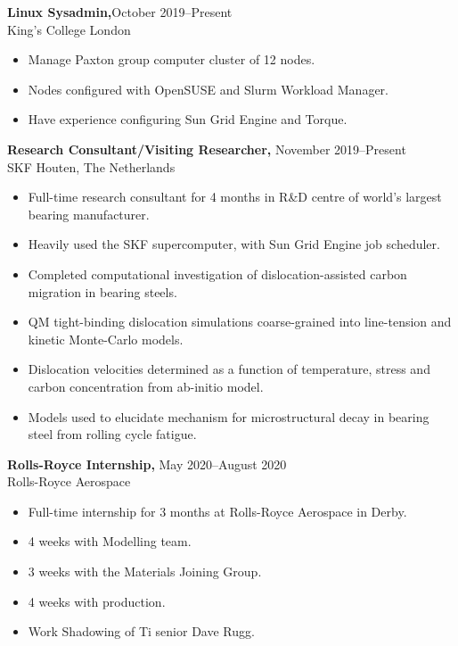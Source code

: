 \documentclass[margin]{res}
\begin{document}
\begin{resume}
{\bf Linux Sysadmin,}\hfill October 2019--Present\\ King's College London
  \begin{itemize} \itemsep -2pt  %
    \item Manage Paxton group computer cluster of 12 nodes. 
    \item Nodes configured with OpenSUSE and Slurm Workload Manager. 
    \item Have experience configuring Sun Grid Engine and Torque. 
  \end{itemize}
  
  

 {\bf Research Consultant/Visiting Researcher,} \hfill November 2019--Present\\ SKF Houten, The Netherlands
  \begin{itemize} \itemsep -2pt  %
    \item Full-time research consultant for 4 months in R\&D centre of world's largest bearing manufacturer.
    \item Heavily used the SKF supercomputer, with Sun Grid Engine job scheduler. 
    \item Completed computational investigation of dislocation-assisted carbon migration in bearing steels. 
    \item QM tight-binding dislocation simulations coarse-grained into line-tension and kinetic Monte-Carlo models. 
    \item Dislocation velocities determined as a function of temperature, stress and carbon concentration from ab-initio model. 
    \item Models used to elucidate mechanism for microstructural decay in bearing steel from rolling cycle fatigue.  
  \end{itemize}



  
 {\bf Rolls-Royce Internship,} \hfill May 2020--August 2020\\ Rolls-Royce Aerospace
  \begin{itemize} \itemsep -2pt  %
    \item Full-time internship for 3 months at Rolls-Royce Aerospace in Derby. 
    \item 4 weeks with Modelling team.
    \item 3 weeks with the Materials Joining Group.
    \item 4 weeks with production.
    \item Work Shadowing of Ti senior Dave Rugg.
  \end{itemize}


\end{resume}
\end{document}
